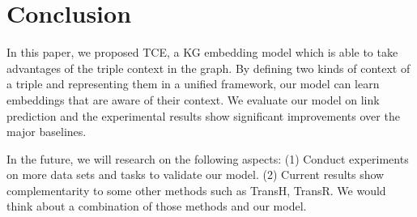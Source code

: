 \section{Conclusion}\label{sec:con}
In this paper, we proposed TCE, a KG embedding model which is able to take advantages of the triple context in the graph. By defining two kinds of context of a triple and representing them in a unified framework, our model can learn embeddings that are aware of their context. We evaluate our model on link prediction and the experimental results show significant improvements over the major baselines.

In the future, we will research on the following aspects: (1) Conduct experiments on more data sets and tasks to validate our model. (2) Current results show complementarity to some other methods such as TransH, TransR. We would think about a combination of those methods and our model.
